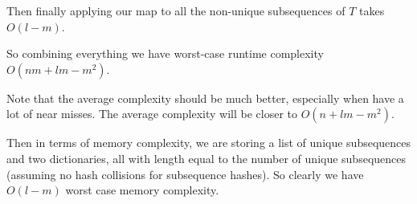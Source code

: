 \documentclass[a4paper, oneside]{book}
\begin{document}
Then finally applying our map to all the non-unique subsequences of $T$ takes $O(l - m)$.

So combining everything we have worst-case runtime complexity $O(nm + lm - m^2)$.

Note that the average complexity should be much better, especially when have a lot
of near misses. The average complexity will be closer to $O(n + lm - m^2)$.

Then in terms of memory complexity, we are storing a list of unique subsequences and two dictionaries,
all with length equal to the number of unique subsequences (assuming no hash collisions for subsequence hashes).
So clearly we have $O(l - m)$ worst case memory complexity.

\end{document}
